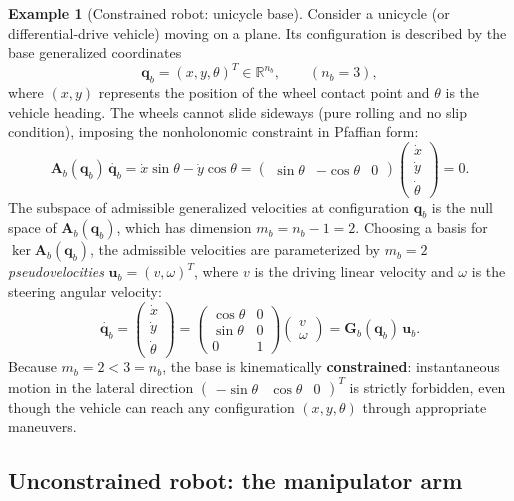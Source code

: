 \documentclass[11pt,a4paper]{article}
\newcommand{\qbase}{\bm{q}_b}
\newcommand{\ubase}{\bm{u}_b}
\newcommand{\Gbase}{\bm{G}_b}
\newcommand{\R}{\mathbb{R}}
\theoremstyle{plain}
\theoremstyle{definition}
\newtheorem{example}[theorem]{Example}
\theoremstyle{remark}
\begin{document}
\begin{example}[Constrained robot: unicycle base]
Consider a unicycle (or differential-drive vehicle) moving on a plane. Its configuration is described by the base generalized coordinates
\[
\qbase = (x, y, \theta)^T \in \R^{n_b},\qquad (n_b = 3),
\]
where $(x,y)$ represents the position of the wheel contact point and $\theta$ is the vehicle heading.
The wheels cannot slide sideways (pure rolling and no slip condition), imposing the nonholonomic constraint in Pfaffian form:
\[
\bm A_b(\qbase)\,\dot{\qbase} = \dot x\sin\theta - \dot y\cos\theta = \begin{pmatrix}\sin\theta & -\cos\theta & 0\end{pmatrix}\begin{pmatrix}\dot x\\ \dot y\\ \dot\theta\end{pmatrix} = 0.
\]
The subspace of admissible generalized velocities at configuration $\qbase$ is the null space of $\bm A_b(\qbase)$, which has dimension $m_b = n_b - 1 = 2$.
Choosing a basis for $\ker\bm A_b(\qbase)$, the admissible velocities are parameterized by $m_b = 2$ \emph{pseudovelocities} $\ubase = (v, \omega)^T$, where $v$ is the driving linear velocity and $\omega$ is the steering angular velocity:
\[
\dot{\qbase} = \begin{pmatrix}\dot x\\ \dot y\\ \dot\theta\end{pmatrix} = \begin{pmatrix}\cos\theta & 0\\ \sin\theta & 0\\ 0 & 1\end{pmatrix}\begin{pmatrix}v\\ \omega\end{pmatrix} = \Gbase(\qbase)\,\ubase .
\]
Because $m_b = 2 < 3 = n_b$, the base is kinematically \textbf{constrained}: instantaneous motion in the lateral direction $\begin{pmatrix}-\sin\theta & \cos\theta & 0\end{pmatrix}^T$ is strictly forbidden, even though the vehicle can reach any configuration $(x,y,\theta)$ through appropriate maneuvers.
\end{example}

\subsection*{Unconstrained robot: the manipulator arm}
\end{document}
